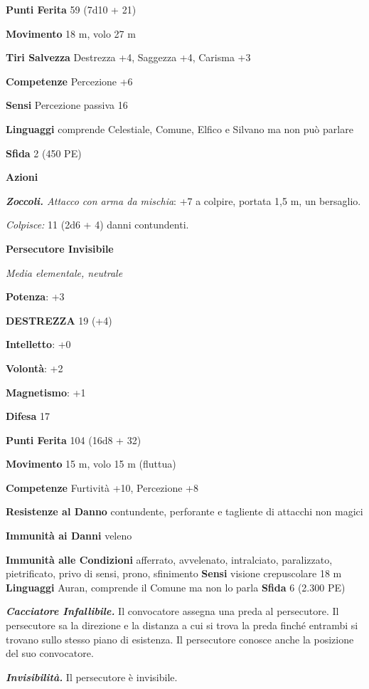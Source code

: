 \begin{multicols}{2}
\textbf{Punti Ferita} 59 (7d10 + 21)

\textbf{Movimento} 18 m, volo 27 m

\textbf{Tiri Salvezza} Destrezza +4, Saggezza +4, Carisma +3

\textbf{Competenze} Percezione +6

\textbf{Sensi} Percezione passiva 16

\textbf{Linguaggi} comprende Celestiale, Comune, Elfico e Silvano ma non
può parlare

\textbf{Sfida} 2 (450 PE)

\textbf{Azioni}

\emph{\textbf{Zoccoli.} Attacco con arma da mischia}: +7 a colpire,
portata 1,5 m, un bersaglio.

\emph{Colpisce:} 11 (2d6 + 4) danni contundenti.

\textbf{Persecutore Invisibile}

\emph{Media elementale, neutrale}

\textbf{Potenza}: +3

\textbf{DESTREZZA} 19 (+4)



\textbf{Intelletto}: +0

\textbf{Volontà}: +2

\textbf{Magnetismo}: +1

\textbf{Difesa} 17

\textbf{Punti Ferita} 104 (16d8 + 32)

\textbf{Movimento} 15 m, volo 15 m (fluttua)

\textbf{Competenze} Furtività +10, Percezione +8

\textbf{Resistenze al Danno} contundente, perforante e tagliente di
attacchi non magici

\textbf{Immunità ai Danni} veleno

\textbf{Immunità alle Condizioni} afferrato, avvelenato, intralciato,
paralizzato, pietrificato, privo di sensi, prono, sfinimento
\textbf{Sensi} visione crepuscolare 18 m
\textbf{Linguaggi} Auran, comprende il Comune ma non lo parla
\textbf{Sfida} 6 (2.300 PE)

\emph{\textbf{Cacciatore Infallibile.}} Il convocatore assegna una preda
al persecutore. Il persecutore sa la direzione e la distanza a cui si
trova la preda finché entrambi si trovano sullo stesso piano di
esistenza. Il persecutore conosce anche la posizione del suo
convocatore.

\emph{\textbf{Invisibilità.}} Il persecutore è invisibile.


\end{multicols}
